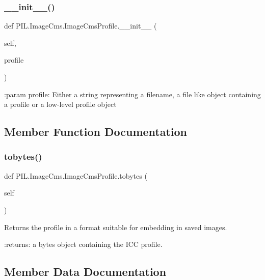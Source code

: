\subsubsection{\texorpdfstring{\+\_\+\+\_\+init\+\_\+\+\_\+()}{\_\_init\_\_()}}
{\footnotesize\ttfamily def P\+I\+L.\+Image\+Cms.\+Image\+Cms\+Profile.\+\_\+\+\_\+init\+\_\+\+\_\+ (\begin{DoxyParamCaption}\item[{}]{self,  }\item[{}]{profile }\end{DoxyParamCaption})}

\begin{DoxyVerb}:param profile: Either a string representing a filename,
    a file like object containing a profile or a
    low-level profile object\end{DoxyVerb}
 

\subsection{Member Function Documentation}
\mbox{\label{classPIL_1_1ImageCms_1_1ImageCmsProfile_a160c9e47af83f3ebde1fad8a21fce31c}} 
\subsubsection{\texorpdfstring{tobytes()}{tobytes()}}
{\footnotesize\ttfamily def P\+I\+L.\+Image\+Cms.\+Image\+Cms\+Profile.\+tobytes (\begin{DoxyParamCaption}\item[{}]{self }\end{DoxyParamCaption})}

\begin{DoxyVerb}Returns the profile in a format suitable for embedding in
saved images.

:returns: a bytes object containing the ICC profile.
\end{DoxyVerb}
 

\subsection{Member Data Documentation}
\mbox{\label{classPIL_1_1ImageCms_1_1ImageCmsProfile_aaede2f1acabc6ace55b12378ed622170}} 
